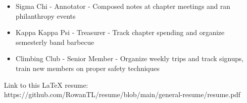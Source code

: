 \documentclass[11pt]{article}
\begin{document}
\begin{itemize}[noitemsep, topsep=0pt, partopsep=0pt, parsep=0pt, itemsep=0pt]
    \small
    \item Sigma Chi - Annotator - Composed notes at chapter meetings and ran philanthropy events
    \item Kappa Kappa Psi - Treasurer - Track chapter spending and organize semesterly band barbecue
    \item Climbing Club - Senior Member - Organize weekly trips and track signups, train new members on proper safety techniques
\end{itemize}

\begin{center}
    \tiny{Link to this LaTeX resume: https://github.com/RowanTL/resume/blob/main/general-resume/resume.pdf}
\end{center}
\end{document}
